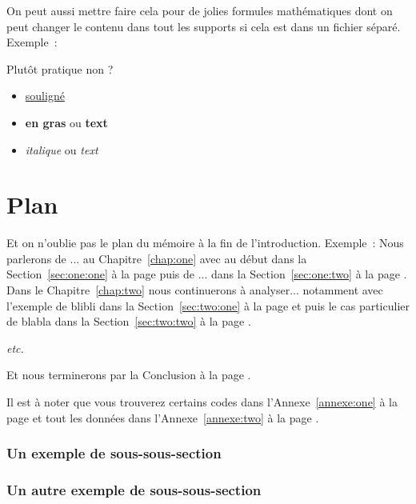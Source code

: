 On peut aussi mettre faire cela pour de jolies formules mathématiques dont on peut changer le contenu dans tout les supports si cela est dans un fichier séparé. Exemple~:


Plutôt pratique non ?

\begin{itemize}
\item \underline{souligné}
\item {\bf en gras} ou \textbf{text}
\item {\it italique} ou \textit{text}
\end{itemize}

{}
\section*{Plan}
Et on n'oublie pas le plan du mémoire à la fin de l'introduction. Exemple~:
Nous parlerons de ... au Chapitre~\ref{chap:one} avec au début dans la Section~\ref{sec:one:one} à la page \pageref{sec:one:one} puis de ... dans la Section~\ref{sec:one:two} à la page \pageref{sec:one:two}. Dans le Chapitre~\ref{chap:two} nous continuerons à analyser... notamment avec l'exemple de blibli dans la Section~\ref{sec:two:one} à la page \pageref{sec:two:one} et puis le cas particulier de blabla dans la Section~\ref{sec:two:two} à la page \pageref{sec:two:two}.


\textit{etc.}

Et nous terminerons par la Conclusion à la page \pageref{chap:conclu}.

Il est à noter que vous trouverez certains codes dans l'Annexe~\ref{annexe:one} à la page \pageref{annexe:one} et tout les données dans l'Annexe~\ref{annexe:two} à la page \pageref{annexe:two}.


\subsubsection{Un exemple de sous-sous-section}



\subsubsection{Un autre exemple de sous-sous-section}




